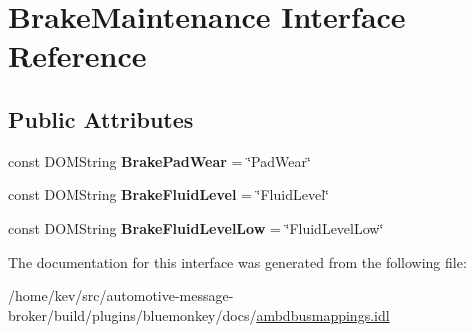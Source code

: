 \hypertarget{interfaceBrakeMaintenance}{\section{Brake\+Maintenance Interface Reference}
\label{interfaceBrakeMaintenance}
}
\subsection*{Public Attributes}
\begin{DoxyCompactItemize}
\item 
\hypertarget{interfaceBrakeMaintenance_a2da7ee50f0528e3e7f1b7317c57a0ea4}{const D\+O\+M\+String {\bfseries Brake\+Pad\+Wear} = \char`\"{}Pad\+Wear\char`\"{}}\label{interfaceBrakeMaintenance_a2da7ee50f0528e3e7f1b7317c57a0ea4}

\item 
\hypertarget{interfaceBrakeMaintenance_a84984ddf4ca782a8bf8fd1a64c773aee}{const D\+O\+M\+String {\bfseries Brake\+Fluid\+Level} = \char`\"{}Fluid\+Level\char`\"{}}\label{interfaceBrakeMaintenance_a84984ddf4ca782a8bf8fd1a64c773aee}

\item 
\hypertarget{interfaceBrakeMaintenance_a947300ba92f881da80c38e55c257c68b}{const D\+O\+M\+String {\bfseries Brake\+Fluid\+Level\+Low} = \char`\"{}Fluid\+Level\+Low\char`\"{}}\label{interfaceBrakeMaintenance_a947300ba92f881da80c38e55c257c68b}

\end{DoxyCompactItemize}


The documentation for this interface was generated from the following file\+:\begin{DoxyCompactItemize}
\item 
/home/kev/src/automotive-\/message-\/broker/build/plugins/bluemonkey/docs/\hyperlink{ambdbusmappings_8idl}{ambdbusmappings.\+idl}\end{DoxyCompactItemize}
